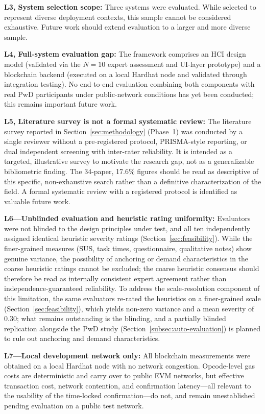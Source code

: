 \documentclass[journal,onecolumn]{IEEEtran}
\begin{document}
\textbf{L3, System selection scope:} Three systems were evaluated. While selected to represent diverse deployment contexts, this sample cannot be considered exhaustive. Future work should extend evaluation to a larger and more diverse sample.

\textbf{L4, Full-system evaluation gap:} The framework comprises an HCI design model (validated via the $N=10$ expert assessment and UI-layer prototype) and a blockchain backend (executed on a local Hardhat node and validated through integration testing). No end-to-end evaluation combining both components with real PwD participants under public-network conditions has yet been conducted; this remains important future work.

\textbf{L5, Literature survey is not a formal systematic review:} The literature survey reported in Section~\ref{sec:methodology} (Phase~1) was conducted by a single reviewer without a pre-registered protocol, PRISMA-style reporting, or dual independent screening with inter-rater reliability. It is intended as a targeted, illustrative survey to motivate the research gap, not as a generalizable bibliometric finding. The 34-paper, 17.6\% figures should be read as descriptive of this specific, non-exhaustive search rather than a definitive characterization of the field. A formal systematic review with a registered protocol is identified as valuable future work.

\textbf{L6---Unblinded evaluation and heuristic rating uniformity:} Evaluators were not blinded to the design principles under test, and all ten independently assigned identical heuristic severity ratings (Section~\ref{sec:feasibility}). While the finer-grained measures (SUS, task times, questionnaire, qualitative notes) show genuine variance, the possibility of anchoring or demand characteristics in the coarse heuristic ratings cannot be excluded; the coarse heuristic consensus should therefore be read as internally consistent expert agreement rather than independence-guaranteed reliability. To address the scale-resolution component of this limitation, the same evaluators re-rated the heuristics on a finer-grained scale (Section~\ref{sec:feasibility}), which yields non-zero variance and a mean severity of 0.30; what remains outstanding is the blinding, and a partially blinded replication alongside the PwD study (Section~\ref{subsec:auto-evaluation}) is planned to rule out anchoring and demand characteristics.

\textbf{L7---Local development network only:} All blockchain measurements were obtained on a local Hardhat node with no network congestion. Opcode-level gas costs are deterministic and carry over to public EVM networks, but effective transaction cost, network contention, and confirmation latency---all relevant to the usability of the time-locked confirmation---do not, and remain unestablished pending evaluation on a public test network.
\end{document}

